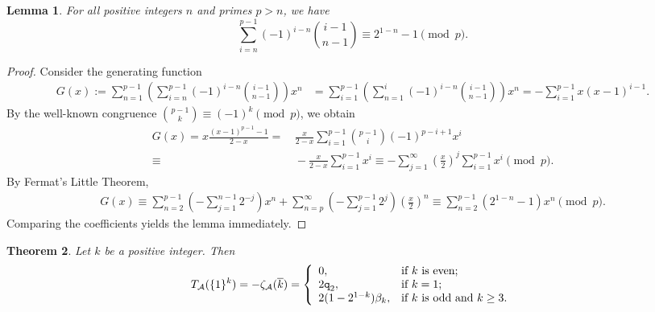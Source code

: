 \documentclass{article}
\newcommand{\calA}{\mathcal{A}}
\newcommand{\ol}{\overline}
\theoremstyle{plain}
\newtheorem{thm}{Theorem}[section]
\newtheorem{lem}[thm]{Lemma}
\theoremstyle{definition}
\begin{document}
\begin{lem}\label{lem:comb}
For all positive integers $n$ and primes $p>n$, we have
\begin{equation*}
\sum_{i=n}^{p-1}(-1)^{i-n}\binom{i-1}{n-1}\equiv 2^{1-n}-1\pmod{p}.
\end{equation*}
\end{lem}

\begin{proof}
Consider the generating function
\begin{align*}
G(x):=\sum_{n=1}^{p-1}\left(\sum_{i=n}^{p-1}(-1)^{i-n}\binom{i-1}{n-{1}}\right)x^{n}
&=\sum_{i=1}^{p-1}\left(\sum_{n=1}^{i}(-1)^{i-n}\binom{i-1}{n-{1}}\right)x^{n}=-\sum_{i=1}^{p-1}x(x-1)^{i-1}.
\end{align*}
By the well-known congruence $\binom{p-1}{k}\equiv (-1)^{k}\pmod{p}$, we obtain
\begin{align*}
G(x)=x\frac{(x-1)^{p-1}-1}{2-x}=&\, \frac{x}{2-x}\sum_{i=1}^{p-1}\binom{p-1}{i}(-1)^{p-i+1}x^{i}\\
 \equiv&\,  -\frac{x}{2-x}\sum_{i=1}^{p-1}x^{i}\equiv-\sum_{j=1}^{\infty}\left(\frac x2\right)^j\sum_{i=1}^{p-1}x^{i} \pmod{p}.
\end{align*}
By Fermat's Little Theorem,
\begin{align*}
G(x) \equiv\sum_{n=2}^{p-1}\left(-\sum_{j=1}^{n-1}2^{-j}\right)x^{n}
+\sum_{n=p}^{\infty}\left(-\sum_{j=1}^{p-1}2^{j}\right)\left(\frac x2\right)^{n}
\equiv\sum_{n=2}^{p-1}(2^{1-n}-1)x^{n} \pmod{p}.
\end{align*}
Comparing the coefficients yields the lemma immediately.
\end{proof}


\begin{thm}\label{thm:unitTA}
Let $k$ be a positive integer. Then
\begin{equation*}
T_\calA(\{1\}^k)=-\zeta_\calA(\ol{k})
=
\left\{
  \begin{array}{ll}
    0, & \hbox{if $k$ is even;} \\
    2\texttt{q}_2, & \hbox{if $k=1$;} \\
    2(1-2^{1-k})\beta_k, & \hbox{if $k$ is odd and $k\ge 3$.}
  \end{array}
\right.
\end{equation*}
\end{thm}
\end{document}
